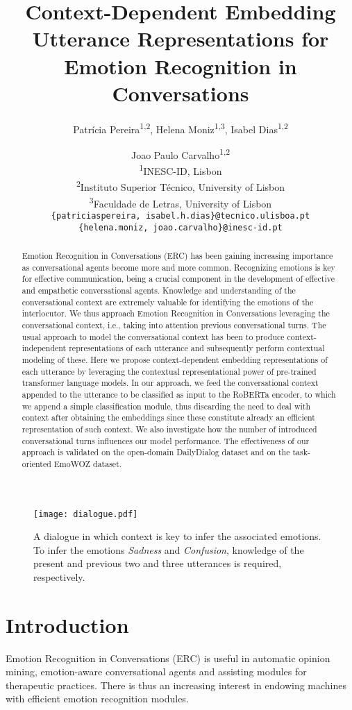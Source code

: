 \documentclass[11pt]{article}
\title{Context-Dependent Embedding Utterance Representations for Emotion Recognition in Conversations}
\author{Patrícia Pereira\textsuperscript{1,2}, Helena Moniz\textsuperscript{1,3}, Isabel Dias\textsuperscript{1,2} \and  Joao Paulo Carvalho\textsuperscript{1,2} \\
\textsuperscript{1}INESC-ID, Lisbon \\
\textsuperscript{2}Instituto Superior Técnico, University of Lisbon \\
\textsuperscript{3}Faculdade de Letras, University of Lisbon \\
\texttt{\{patriciaspereira, isabel.h.dias\}@tecnico.ulisboa.pt} \\
\texttt{\{helena.moniz, joao.carvalho\}@inesc-id.pt} \\
}
\begin{document}
\nolinenumbers
\makeatletter\acl@finalcopytrue
\maketitle
\begin{abstract}
Emotion Recognition in Conversations (ERC) has been gaining increasing importance as conversational agents become more and more common. Recognizing emotions is key for effective communication, being a crucial component in the development of effective and empathetic conversational agents. Knowledge and understanding of the conversational context are extremely valuable for identifying the emotions of the interlocutor. We thus approach Emotion Recognition in Conversations leveraging the conversational context, i.e., taking into attention previous conversational turns. The usual approach to model the conversational context has been to produce context-independent representations of each utterance and subsequently perform contextual modeling of these. Here we propose context-dependent embedding representations of each utterance by leveraging the contextual representational power of pre-trained transformer language models. In our approach, we feed the conversational context appended to the utterance to be classified as input to the RoBERTa encoder, to which we append a simple classification module, thus discarding the need to deal with context after obtaining the embeddings since these constitute already an efficient representation of such context. We also investigate how the number of introduced conversational turns influences our model performance. The effectiveness of our approach is validated on the open-domain DailyDialog dataset and on the task-oriented EmoWOZ dataset.
\end{abstract}


\begin{figure}[!ht]
\begin{center}
  \texttt{[image: dialogue.pdf]}
  
 \end{center}
  \caption{A dialogue in which context is key to infer the associated emotions. To infer the emotions \emph{Sadness} and  \emph{Confusion}, knowledge of the present and previous two and three utterances is required, respectively.
}
  \label{f}
  \end{figure}

\section{Introduction}
Emotion Recognition in Conversations (ERC) is useful in automatic
opinion mining, emotion-aware conversational agents
and assisting modules for therapeutic practices. There is thus an increasing interest in endowing machines with efficient emotion recognition modules.
\end{document}
